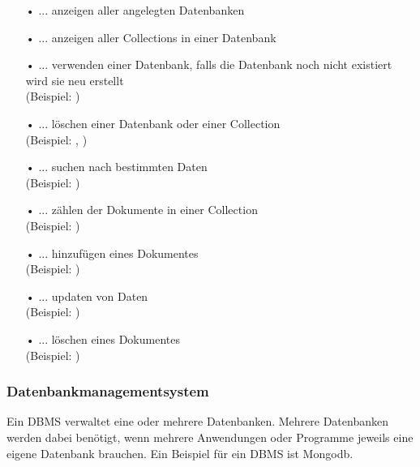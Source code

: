 \begin{itemize} 
\item[•] \textbf{} ... anzeigen aller angelegten Datenbanken
\item[•] \textbf{} ... anzeigen aller Collections in einer Datenbank
\item[•] \textbf{} ... verwenden einer Datenbank, falls die Datenbank noch nicht existiert wird sie neu erstellt 
\\     (Beispiel:  )
\item[•] \textbf{} ... löschen einer Datenbank oder einer Collection
\\     (Beispiel:  , )
\item[•] \textbf{} ... suchen nach bestimmten Daten 
\\     (Beispiel:  )
\item[•] \textbf{} ... zählen der Dokumente in einer Collection
\\     (Beispiel:  )
\item[•] \textbf{} ... hinzufügen eines Dokumentes
\\     (Beispiel:  )
\item[•] \textbf{} ... updaten von Daten
\\     (Beispiel:  )
\item[•] \textbf{} ... löschen eines Dokumentes
\\     (Beispiel:  )
\end{itemize}

\subsubsection{Datenbankmanagementsystem}
Ein \ac{DBMS} verwaltet eine oder mehrere Datenbanken. Mehrere Datenbanken werden dabei benötigt, wenn mehrere Anwendungen oder Programme jeweils eine eigene Datenbank brauchen. Ein Beispiel für ein \ac{DBMS} ist Mongodb.

